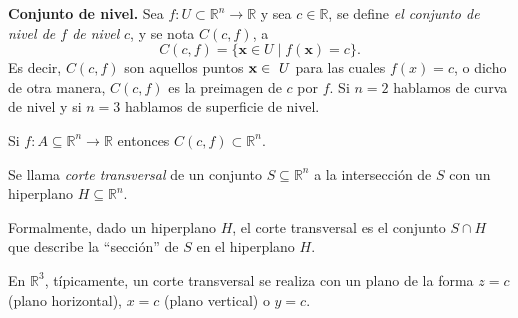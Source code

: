 

\begin{definition} \textbf{Conjunto de nivel.} 
    \label{def:conjunto de nivel}     
    Sea $f: U \subset \mathbb{R}^n \rightarrow \mathbb{R}$ y sea $c \in \mathbb{R}$, se define  \emph{el conjunto de nivel de $f$ de nivel}  $c$, y se nota $C(c,f)$,  a  
    \[
    C(c,f)=\{ \mathbf{x} \in U \;|\; f (\mathbf{x})=c \}.
     \]
    Es decir,  $C(c,f)$ son aquellos puntos $\vect{x}\in\ U$ para las cuales $f(x)=c$, o dicho de otra manera,  $C(c,f)$ es la preimagen de $c$ por $f$.   Si $n=2$ hablamos de curva de nivel  y si $n=3$  hablamos de superficie de nivel.  
    
    \begin{obs}  Si $f: A \subseteq \mathbb{R}^n \rightarrow \mathbb{R}$ entonces $C(c,f)  \subset \mathbb{R}^{n}.$
       \end{obs}
\end{definition}

    
\begin{definition}
        Se llama \emph{corte transversal} de un conjunto \( S \subseteq \mathbb{R}^n \) a la intersección de \( S \) con un hiperplano \( H \subseteq \mathbb{R}^n \).
        
        Formalmente, dado un hiperplano \( H \), el corte transversal es el conjunto \(S \cap H\) que describe la ``sección'' de \( S \) en el hiperplano \( H \).
        
        En \(\mathbb{R}^3\), típicamente, un corte transversal se realiza con un plano de la forma \( z = c \) (plano horizontal), \( x = c \) (plano vertical) o \( y = c \).
\end{definition}
    

